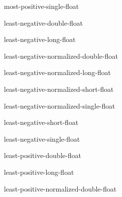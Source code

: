 \documentclass[10pt,english]{book}
\begin{document}
\begin{constant}{most-positive-single-float}{}
  
\end{constant}

\begin{constant}{least-negative-double-float}{}
  
\end{constant}

\begin{constant}{least-negative-long-float}{}
  
\end{constant}

\begin{constant}{least-negative-normalized-double-float}{}
  
\end{constant}

\begin{constant}{least-negative-normalized-long-float}{}
  
\end{constant}

\begin{constant}{least-negative-normalized-short-float}{}
  
\end{constant}

\begin{constant}{least-negative-normalized-single-float}{}
  
\end{constant}

\begin{constant}{least-negative-short-float}{}
  
\end{constant}

\begin{constant}{least-negative-single-float}{}
  
\end{constant}

\begin{constant}{least-positive-double-float}{}
  
\end{constant}

\begin{constant}{least-positive-long-float}{}
  
\end{constant}

\begin{constant}{least-positive-normalized-double-float}{}
  
\end{constant}
\end{document}
